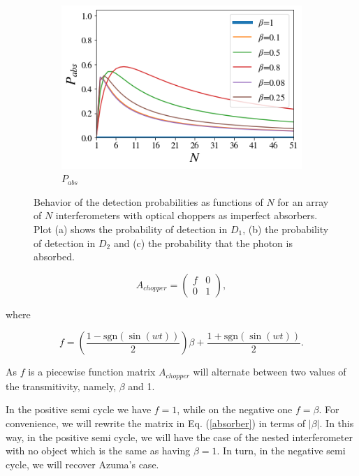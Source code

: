\documentclass[12pt]{book}
\begin{document}
\begin{figure}[!t]
\begin{subfigure}[b]{0.45\linewidth}
\includegraphics[width=\linewidth]{images/Chopper_abs.png}
\caption{$P_{abs}$}
\label{fig:BS1}
\end{subfigure}
\caption{Behavior of the detection probabilities as functions of $N$ for an array of $N$ interferometers with optical choppers as imperfect absorbers. Plot (a) shows the probability of detection in $D_{1}$, (b) the probability of detection in $D_{2}$ and (c) the probability that the photon is absorbed.}
\label{fig:several_chpper}
\end{figure}

\begin{equation}
A_{chopper}=\begin{pmatrix} f & 0 \\ 0 & 1 \end{pmatrix},
\end{equation}

where

\begin{equation}
f=\left(\frac{1-\mathrm{sgn}(\sin(wt))}{2} \right)\beta+\frac{1+\mathrm{sgn}(\sin(wt))}{2}.
\end{equation}

As $f$ is a piecewise function matrix $A_{chopper}$ will alternate between two values of the transmitivity, namely, $\beta$ and 1.



In the positive semi cycle we have $f=1$, while on the negative one $f=\beta$. For convenience, we will rewrite the matrix in Eq. (\ref{absorber}) in terms of $|\beta|$. In this way, in the positive semi cycle, we will have the case of the nested interferometer with no object which is the same as having $\beta=1$. In turn, in the negative semi cycle, we will recover  Azuma's case.
\end{document}
